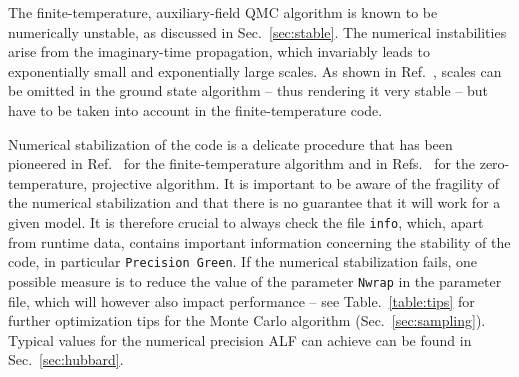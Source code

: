 The finite-temperature, auxiliary-field QMC algorithm is known to be numerically unstable, as discussed in Sec.~\ref{sec:stable}.
The numerical instabilities arise from the imaginary-time propagation, which invariably leads to exponentially small and exponentially large scales.
As shown in Ref.~\cite{Assaad08_rev}, scales can be omitted in the ground state algorithm -- thus rendering it very stable --  but have to be taken into account in the  finite-temperature code.

Numerical stabilization of the code is a delicate procedure that has been pioneered in Ref.~\cite{White89}  for the finite-temperature algorithm and in Refs.~\cite{Sugiyama86,Sorella89} for the zero-temperature, projective algorithm.
It is important to be aware of the fragility of the numerical stabilization and that there is no guarantee that it will work for a given model. It is therefore crucial to always check the file \texttt{info}, which, apart from runtime data, contains important information concerning the stability of the code, in particular \texttt{Precision Green}.
If the numerical stabilization fails, one possible measure is to reduce the value of the parameter \texttt{Nwrap} in the parameter file, which will however also impact performance -- see Table.~\ref{table:tips} for further optimization tips for the Monte Carlo algorithm (Sec.~\ref{sec:sampling}). Typical values for the numerical precision ALF can achieve can be found in Sec.~\ref{sec:hubbard}.

